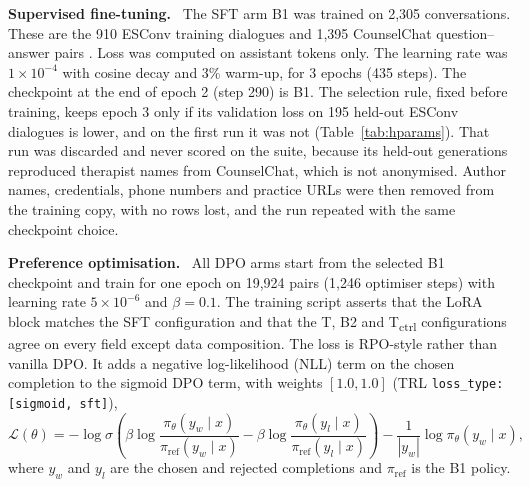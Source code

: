 \documentclass[10pt]{article} %
\newcommand{\Bo}{B1}
\newcommand{\Bt}{B2}
\newcommand{\T}{T}
\newcommand{\Tctrl}{T\textsubscript{ctrl}}
\newcommand{\lead}[1]{\textbf{#1}\ }
\begin{document}
\lead{Supervised fine-tuning.} The SFT arm \Bo{} was trained on 2,305 conversations. These are the 910 ESConv training dialogues \citep{liu2021esconv} and 1,395 CounselChat question--answer pairs \citep{bertagnolli2020counselchat}. Loss was computed on assistant tokens only. The learning rate was $1\times10^{-4}$ with cosine decay and 3\% warm-up, for 3 epochs (435 steps). The checkpoint at the end of epoch 2 (step 290) is \Bo{}. The selection rule, fixed before training, keeps epoch 3 only if its validation loss on 195 held-out ESConv dialogues is lower, and on the first run it was not (Table~\ref{tab:hparams}). That run was discarded and never scored on the suite, because its held-out generations reproduced therapist names from CounselChat, which is not anonymised. Author names, credentials, phone numbers and practice URLs were then removed from the training copy, with no rows lost, and the run repeated with the same checkpoint choice.

\lead{Preference optimisation.} All DPO arms start from the selected \Bo{} checkpoint and train for one epoch on 19,924 pairs (1,246 optimiser steps) with learning rate $5\times10^{-6}$ and $\beta=0.1$. The training script asserts that the LoRA block matches the SFT configuration and that the \T{}, \Bt{} and \Tctrl{} configurations agree on every field except data composition. The loss is RPO-style rather than vanilla DPO. It adds a negative log-likelihood (NLL) term on the chosen completion to the sigmoid DPO term, with weights $[1.0, 1.0]$ (TRL \texttt{loss\_type: [sigmoid, sft]}),
\begin{equation}
\label{eq:rpo}
\mathcal{L}(\theta) = -\log\sigma\!\left(\beta\log\frac{\pi_\theta(y_w\mid x)}{\pi_{\mathrm{ref}}(y_w\mid x)} - \beta\log\frac{\pi_\theta(y_l\mid x)}{\pi_{\mathrm{ref}}(y_l\mid x)}\right) - \frac{1}{|y_w|}\log\pi_\theta(y_w\mid x),
\end{equation}
where $y_w$ and $y_l$ are the chosen and rejected completions and $\pi_{\mathrm{ref}}$ is the \Bo{} policy.
\end{document}
